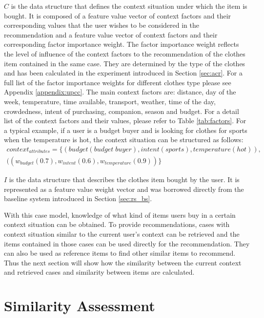 $C$ is the data structure that defines the context situation under which the item is bought. It is composed of a feature value vector of context factors and their corresponding values that the user wishes to be considered in the recommendation and a feature value vector of context factors and their corresponding factor importance weight. The factor importance weight reflects the level of influence of the context factors to the recommendation of the clothes item contained in the same case. They are determined by the type of the clothes and has been calculated in the experiment introduced in Section \ref{sec:acr}. For a full list of the factor importance weights for different clothes type please see Appendix \ref{appendix:upcc}. The main context factors are: distance, day of the week, temperature, time available, transport, weather, time of the day, crowdedness, intent of purchasing, companion, season and budget. For a detail list of the context factors and their values, please refer to Table \ref{tab:factors}. For a typical example, if a user is a budget buyer and is looking for clothes for sports when the temperature is hot, the context situation can be structured as follows:
\begin{equation} \label{eq:context}
\begin{split}
	{context}_{attributes} = \{(budget (budget\;buyer), intent (sports), temperature (hot)), &\\
	                                            ((w_{budget}(0.7), w_{intent}(0.6), w_{temperature}(0.9))\} &
\end{split}
\end{equation}

$I$ is the data structure that describes the clothes item bought by the user. It is represented as a feature value weight vector \cite{ref:30} and was borrowed directly from the baseline system introduced in Section \ref{sec:rs_bs}. 

With this case model, knowledge of what kind of items users buy in a certain context situation can be obtained. To provide recommendations, cases with context situation similar to the current user's context can be retrieved and the items contained in those cases can be used directly for the recommendation. They can also be used as reference items to find other similar items to recommend. Thus the next section will show how the similarity between the current context and retrieved cases and similarity between items are calculated.

\section{Similarity Assessment} \label{sec:sa}


